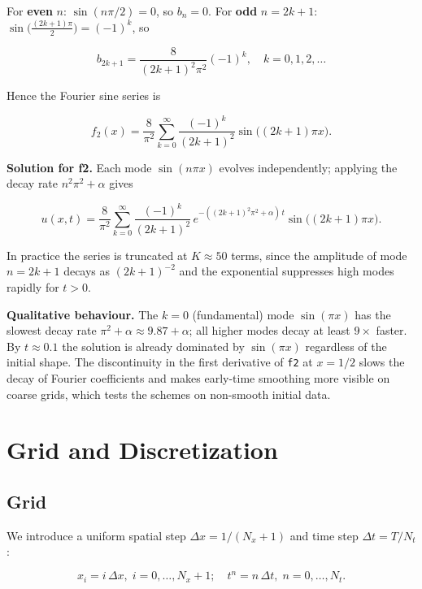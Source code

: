 \documentclass[11pt,a4paper]{article}
\begin{document}
For \textbf{even} $n$: $\sin(n\pi/2) = 0$, so $b_n = 0$. For \textbf{odd} $n = 2k+1$: $\sin\!\bigl(\tfrac{(2k+1)\pi}{2}\bigr) = (-1)^k$, so

\begin{equation}
b_{2k+1} = \frac{8}{(2k+1)^2\pi^2}(-1)^k, \quad k = 0, 1, 2, \ldots \tag{11}
\end{equation}

Hence the Fourier sine series is

\begin{equation}
{f_2(x) = \frac{8}{\pi^2}\sum_{k=0}^{\infty} \frac{(-1)^k}{(2k+1)^2}\sin\bigl((2k+1)\pi x\bigr).} \tag{12}
\end{equation}

\textbf{Solution for f2.} Each mode $\sin(n\pi x)$ evolves independently; applying the decay rate $n^2\pi^2 + \alpha$ gives

\begin{equation}
u(x,t) = \frac{8}{\pi^2}\sum_{k=0}^{\infty} \frac{(-1)^k}{(2k+1)^2}\,e^{-((2k+1)^2\pi^2+\alpha)\,t}\sin\bigl((2k+1)\pi x\bigr). \tag{13}
\end{equation}

In practice the series is truncated at $K \approx 50$ terms, since the amplitude of mode $n = 2k+1$ decays as $(2k+1)^{-2}$ and the exponential suppresses high modes rapidly for $t > 0$.

\textbf{Qualitative behaviour.} The $k=0$ (fundamental) mode $\sin(\pi x)$ has the slowest decay rate $\pi^2 + \alpha \approx 9.87 + \alpha$; all higher modes decay at least $9\times$ faster. By $t \approx 0.1$ the solution is already dominated by $\sin(\pi x)$ regardless of the initial shape. The discontinuity in the first derivative of \texttt{f2} at $x = 1/2$ slows the decay of Fourier coefficients and makes early-time smoothing more visible on coarse grids, which tests the schemes on non-smooth initial data.

\section{Grid and Discretization}

\subsection{Grid}

We introduce a uniform spatial step $\Delta x = 1/(N_x+1)$ and time step $\Delta t = T/N_t$:

\begin{equation}
x_i = i\,\Delta x,\; i = 0,\ldots,N_x+1;\quad t^n = n\,\Delta t,\; n = 0,\ldots,N_t. \tag{14}
\end{equation}
\end{document}
